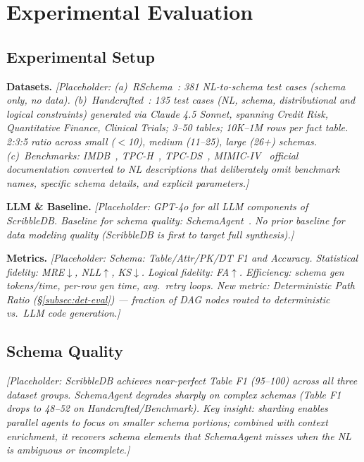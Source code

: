 \section{Experimental Evaluation}
\label{sec:eval}

\subsection{Experimental Setup}

\noindent\textbf{Datasets.}
\textit{[Placeholder:
(a)~RSchema~\cite{wang2025text2schema}: 381 NL-to-schema test cases (schema only, no data).
(b)~Handcrafted~\cite{aviroop2026scribbledb}: 135 test cases (NL, schema, distributional
and logical constraints) generated via Claude 4.5 Sonnet, spanning Credit Risk,
Quantitative Finance, Clinical Trials; 3--50 tables; 10K--1M rows per fact table.
2:3:5 ratio across small ($<$10), medium (11--25), large (26+) schemas.
(c)~Benchmarks: IMDB~\cite{imdb2024}, TPC-H~\cite{tpch2022}, TPC-DS~\cite{tpcds2024},
MIMIC-IV~\cite{johnson2024mimic} official documentation converted to NL descriptions
that deliberately omit benchmark names, specific schema details, and explicit parameters.]}

\noindent\textbf{LLM \& Baseline.}
\textit{[Placeholder: GPT-4o for all LLM components of ScribbleDB.
Baseline for schema quality: SchemaAgent~\cite{wang2025text2schema}.
No prior baseline for data modeling quality (ScribbleDB is first to target full synthesis).]}

\noindent\textbf{Metrics.}
\textit{[Placeholder: Schema: Table/Attr/PK/DT F1 and Accuracy.
Statistical fidelity: MRE$\downarrow$, NLL$\uparrow$, KS$\downarrow$.
Logical fidelity: FA$\uparrow$.
Efficiency: schema gen tokens/time, per-row gen time, avg.\ retry loops.
New metric: \emph{Deterministic Path Ratio} (\S\ref{subsec:det-eval}) --- fraction of DAG
nodes routed to deterministic vs.\ LLM code generation.]}

\subsection{Schema Quality}
\label{subsec:schema-quality}

\textit{[Placeholder: ScribbleDB achieves near-perfect Table F1 (95--100) across all three
dataset groups. SchemaAgent degrades sharply on complex schemas
(Table F1 drops to 48--52 on Handcrafted/Benchmark).
Key insight: sharding enables parallel agents to focus on smaller schema portions; combined
with context enrichment, it recovers schema elements that SchemaAgent misses when the NL is
ambiguous or incomplete.]}

